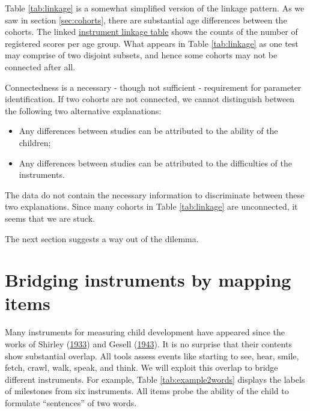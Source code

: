 \documentclass[
]{book}
\providecommand{\tightlist}{%
  \setlength{\itemsep}{0pt}\setlength{\parskip}{0pt}}
\begin{document}
Table \ref{tab:linkage} is a somewhat simplified version of the linkage pattern. As we saw in section \ref{sec:cohorts}, there are substantial age differences between the cohorts. The linked \href{https://tnochildhealthstatistics.shinyapps.io/GCDG_instrument_linkage/}{instrument linkage table} shows the counts of the number of registered scores per age group. What appears in Table \ref{tab:linkage} as one test may comprise of two disjoint subsets, and hence some cohorts may not be connected after all.

Connectedness is a necessary - though not sufficient - requirement for parameter identification. If two cohorts are not connected, we cannot distinguish between the following two alternative explanations:

\begin{itemize}
\tightlist
\item
  Any differences between studies can be attributed to the ability of the children;
\item
  Any differences between studies can be attributed to the difficulties of the instruments.
\end{itemize}

The data do not contain the necessary information to discriminate between these two explanations. Since many cohorts in Table \ref{tab:linkage} are unconnected, it seems that we are stuck.

The next section suggests a way out of the dilemma.

\hypertarget{sec:mapping}{%
\section{Bridging instruments by mapping items}\label{sec:mapping}}

Many instruments for measuring child development have appeared since the works of Shirley (\protect\hyperlink{ref-shirley1933}{1933}) and Gesell (\protect\hyperlink{ref-gesell1943}{1943}). It is no surprise that their contents show substantial overlap. All tools assess events like starting to see, hear, smile, fetch, crawl, walk, speak, and think. We will exploit this overlap to bridge different instruments. For example, Table \ref{tab:example2words} displays the labels of milestones from six instruments. All items probe the ability of the child to formulate ``sentences'' of two words.
\end{document}
